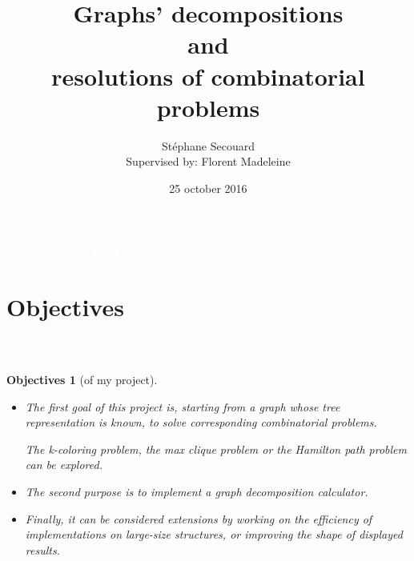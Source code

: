 \documentclass[8pt]{beamer}
\title[Graphs' decompositions\\ and \\ resolutions of combinatorial problems]{Graphs' decompositions\\ and \\ resolutions of combinatorial problems}
\author[Stéphane Secouard]{\small {Stéphane Secouard\\ \footnotesize Supervised by: Florent Madeleine}}
\institute[Caen University]{\textbf {Caen University - Computer science }}
\date{25 october 2016}
\newtheorem*{obj}{Objectives}
\begin{document}
\begin{frame}

  \titlepage
\end{frame}


\begin{frame}

  \frametitle{ \textcolor{white}{Table of contents}}

  \tableofcontents

\end{frame}







\section{Objectives}

\begin{frame}
  \frametitle{ \textcolor{white}{Objectives}}

  \begin{obj}[of my project]
  \begin{itemize}
  \item The first goal of this project is, starting from a graph whose  tree representation is known, to solve corresponding combinatorial problems.

    The k-coloring problem, the max clique problem or the Hamilton path problem can be explored.

\item The second purpose is to implement a graph decomposition calculator.

\item Finally, it can be considered extensions by working on the efficiency of implementations on large-size structures, or improving the shape of displayed results.
  \end{itemize}
  \end{obj}

\end{frame}
\end{document}
